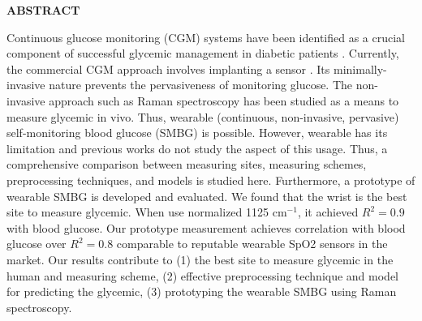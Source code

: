 {}

\begin{center}
    \large{\bf ABSTRACT}
\end{center}

\begin{sloppypar}
Continuous glucose monitoring (CGM) systems have been identified as a crucial component of successful glycemic management in diabetic patients \citep{continuous2021}.
Currently, the commercial CGM approach involves implanting a sensor \citep{CGMminimalinvasive}.
Its minimally-invasive nature prevents the pervasiveness of monitoring glucose.
The non-invasive approach such as Raman spectroscopy has been studied as a means to measure glycemic in vivo.
Thus, wearable (continuous, non-invasive, pervasive) self-monitoring blood glucose (SMBG) is possible.
However, wearable has its limitation and previous works do not study the aspect of this usage. 
Thus, a comprehensive comparison between measuring sites, measuring schemes, preprocessing techniques, and models is studied here.
Furthermore, a prototype of wearable SMBG is developed and evaluated.
We found that the wrist is the best site to measure glycemic. 
When use normalized 1125 $\text{cm}^{-1}$, it achieved $R^2 = 0.9$ with blood glucose.
Our prototype measurement achieves correlation with blood glucose over $R^2 = 0.8$ comparable to reputable wearable SpO2 sensors in the market. 
Our results contribute to (1) the best site to measure glycemic in the human and measuring scheme, 
(2) effective preprocessing technique and model for predicting the glycemic,
(3) prototyping the wearable SMBG using Raman spectroscopy.
\end{sloppypar}
